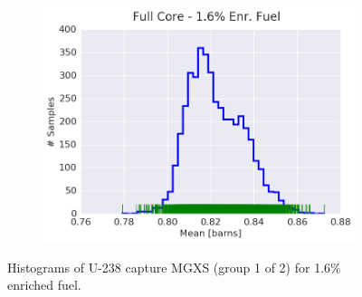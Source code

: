 \begin{figure}[h!]
\begin{subfigure}{0.5\textwidth}
  \includegraphics[width=\linewidth]{figures/patterns/full-core/hist-kde-rug/16-enr-capt-1} \caption{}
  \label{fig:chap9-hist-full-core-1.6-capt}
\end{subfigure}
\caption[Histogram of U-238 capture MGXS for 1.6\% enriched fuel]{Histograms of U-238 capture \ac{MGXS} (group 1 of 2) for 1.6\% enriched fuel.}
\label{fig:chap9-hist-1.6-capt}
\end{figure}

